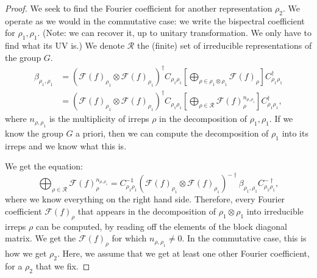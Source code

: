 \documentclass{article}
\begin{document}
\begin{proof}
    We seek to find the Fourier coefficient for another representation $\rho_2$. We operate as we would in the commutative case: we write the bispectral coefficient for $\rho_1, \rho_1$. (Note: we can recover it, up to unitary transformation. We only have to find what its UV is.) We denote $\mathcal{R}$ the (finite) set of irreducible representations of the group $G$.
    \begin{align*}
    \beta_{\rho_1, \rho_1}
    &=
    (\mathcal{F}(f)_{\rho_1} \otimes \mathcal{F}(f)_{\rho_1})^\dagger C_{{\rho_1} {\rho_1}}
    \left[
    \bigoplus_{\rho \in \rho_1 \otimes \rho_1}
        \mathcal{F}(f)_\rho
    \right] C_{{\rho_1} {\rho_1}}^{\dagger}\\
    &=
        (\mathcal{F}(f)_{\rho_1} \otimes \mathcal{F}(f)_{\rho_1})^\dagger
        C_{{\rho_1} {\rho_1}}
    \left[
    \bigoplus_{\rho \in \mathcal{R}}
        \mathcal{F}(f)_\rho^{n_{\rho, \rho_1}}
    \right] C_{{\rho_1} {\rho_1}}^{\dagger},
    \end{align*}
    where $n_{\rho, \rho_1}$ is the multiplicity of irreps $\rho$ in the decomposition of $\rho_1, \rho_1$. If we know the group $G$ a priori, then we can compute the decomposition of $\rho_1$ into its irreps and we know what this is.

    We get the equation:
    \begin{equation}
        \bigoplus_{\rho \in \mathcal{R}}
        \mathcal{F}(f)_\rho^{n_{\rho, \rho_1}}
    = C_{{\rho_1} {\rho_1}}^{-1}(\mathcal{F}(f)_{\rho_1} \otimes \mathcal{F}(f)_{\rho_1})^{-\dagger} \beta_{\rho_1, \rho_1} C_{{\rho_1} {\rho_1}}^{-\dagger},
    \end{equation}
    where we know everything on the right hand side.
    Therefore, every Fourier coefficient $\mathcal{F}(f)_\rho$ that appears in the decomposition of $\rho_1 \otimes \rho_1$ into irreducible irreps $\rho$ can be computed, by reading off the elements of the block diagonal matrix.  We get the $\mathcal{F}(f)_\rho$ for which $n_{\rho, \rho_1} \neq 0$.
    In the commutative case, this is how we get $\rho_2$.
    Here, we assume that we get at least one other Fourier coefficient, for a $\rho_2$ that we fix.


\end{proof}
\end{document}
